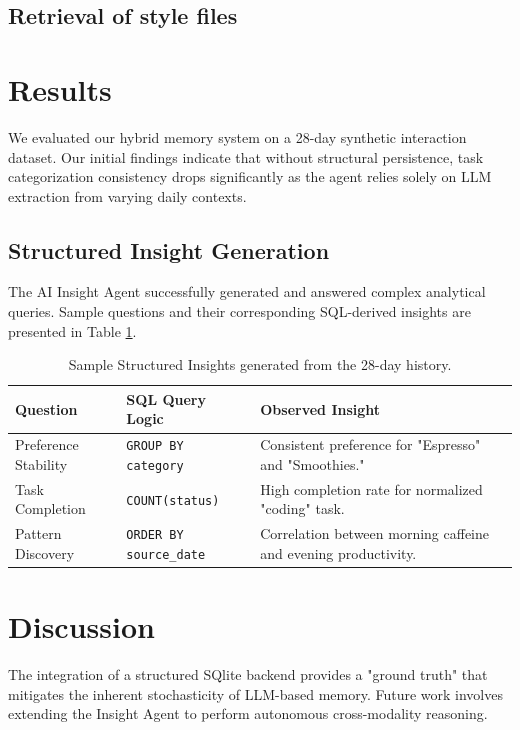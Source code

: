 \documentclass{article}
\begin{document}
\subsection{Retrieval of style files}


\section{Results}
\label{results}

We evaluated our hybrid memory system on a 28-day synthetic interaction dataset. Our initial findings indicate that without structural persistence, task categorization consistency drops significantly as the agent relies solely on LLM extraction from varying daily contexts.

\subsection{Structured Insight Generation}
The AI Insight Agent successfully generated and answered complex analytical queries. Sample questions and their corresponding SQL-derived insights are presented in Table \ref{tab:insights}.

\begin{table}[h]
  \caption{Sample Structured Insights generated from the 28-day history.}
  \label{tab:insights}
  \centering
  \begin{tabular}{lll}
    \toprule
    Question & SQL Query Logic & Observed Insight \\
    \midrule
    Preference Stability & \texttt{GROUP BY category} & Consistent preference for "Espresso" and "Smoothies." \\
    Task Completion & \texttt{COUNT(status)} & High completion rate for normalized "coding" task. \\
    Pattern Discovery & \texttt{ORDER BY source\_date} & Correlation between morning caffeine and evening productivity. \\
    \bottomrule
  \end{tabular}
\end{table}

\section{Discussion}
The integration of a structured SQlite backend provides a "ground truth" that mitigates the inherent stochasticity of LLM-based memory. Future work involves extending the Insight Agent to perform autonomous cross-modality reasoning.
\end{document}
